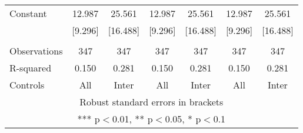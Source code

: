 \begin{tabular}{lcccccc}
Constant & 12.987 & 25.561 & 12.987 & 25.561 & 12.987 & 25.561 \\
 & [9.296] & [16.488] & [9.296] & [16.488] & [9.296] & [16.488] \\
 &  &  &  &  &  &  \\
Observations & 347 & 347 & 347 & 347 & 347 & 347 \\
R-squared & 0.150 & 0.281 & 0.150 & 0.281 & 0.150 & 0.281 \\
 Controls & All & Inter & All & Inter & All & Inter \\ \hline
\multicolumn{7}{c}{ Robust standard errors in brackets} \\
\multicolumn{7}{c}{ *** p$<$0.01, ** p$<$0.05, * p$<$0.1} \\
\end{tabular}
